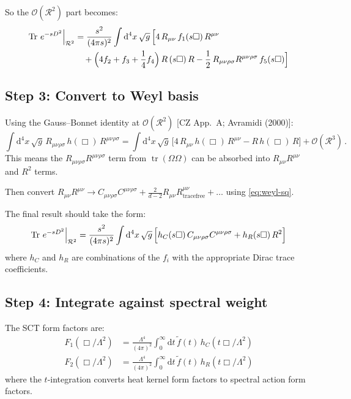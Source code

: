 \documentclass[12pt,a4paper]{article}
\theoremstyle{definition}
\theoremstyle{remark}
\newcommand{\Tr}{\operatorname{Tr}}
\newcommand{\tr}{\operatorname{tr}}
\newcommand{\Rsq}{R_{\mu\nu\rho\sigma}R^{\mu\nu\rho\sigma}}
\newcommand{\Ricsq}{R_{\mu\nu}R^{\mu\nu}}
\newcommand{\Weylsq}{C_{\mu\nu\rho\sigma}C^{\mu\nu\rho\sigma}}
\newcommand{\dd}{\mathrm{d}}
\newcommand{\fromlit}[1]{\textcolor{blue!70!black}{\textsf{[#1]}}}
\begin{document}
So the $\mathcal{O}(\mathcal{R}^2)$ part becomes:
\begin{equation}
  \begin{aligned}
  \Tr\,e^{-sD^2}\Big|_{\mathcal{R}^2}
  &= \frac{s^2}{(4\pi s)^2}\int\dd^4x\,\sqrt{g}\,\Bigl[
  4\,R_{\mu\nu}\,f_1(s\Box)\,R^{\mu\nu}\\
  &\quad+ \Bigl(4f_2 + f_3 + \frac{1}{4}f_4\Bigr)\,
    R\,(s\Box)\,R
  - \frac{1}{2}\,\Rsq\,f_5(s\Box)
  \Bigr]
  \end{aligned}
  \label{eq:heat-trace-dirac-R2}
\end{equation}


\subsection{Step 3: Convert to Weyl basis}

Using the Gauss--Bonnet identity at $\mathcal{O}(\mathcal{R}^2)$
\fromlit{CZ App.~A; Avramidi (2000)}:
\begin{equation}
  \int\dd^4x\,\sqrt{g}\, R_{\mu\nu\rho\sigma}\,h(\Box)\,R^{\mu\nu\rho\sigma}
  = \int\dd^4x\,\sqrt{g}\,\bigl[
  4\,R_{\mu\nu}\,h(\Box)\,R^{\mu\nu} - R\,h(\Box)\,R
  \bigr] + \mathcal{O}(\mathcal{R}^3)\,.
  \label{eq:GB-nonlocal}
\end{equation}
This means the $\Rsq$ term from $\tr(\Omega\Omega)$ can be absorbed
into $\Ricsq$ and $R^2$ terms.

Then convert $\Ricsq \to \Weylsq + \frac{2}{d-2}\Ricsq_{\text{tracefree}} + \ldots$
using \eqref{eq:weyl-sq}.

The final result should take the form:
\begin{equation}
  \Tr\,e^{-sD^2}\Big|_{\mathcal{R}^2}
  = \frac{s^2}{(4\pi s)^2}\int\dd^4x\,\sqrt{g}\,\Bigl[
  h_C(s\Box)\,\Weylsq + h_R(s\Box)\,R^2
  \Bigr]
  \label{eq:heat-trace-weyl}
\end{equation}
where $h_C$ and $h_R$ are combinations of the $f_i$ with the
appropriate Dirac trace coefficients.


\subsection{Step 4: Integrate against spectral weight}

The SCT form factors are:
\begin{equation}
  \boxed{
  \begin{aligned}
  F_1(\Box/\Lambda^2) &= \frac{\Lambda^4}{(4\pi)^2}
    \int_0^\infty\dd t\,\tilde{f}(t)\,
    h_C(t\Box/\Lambda^2)\\[6pt]
  F_2(\Box/\Lambda^2) &= \frac{\Lambda^4}{(4\pi)^2}
    \int_0^\infty\dd t\,\tilde{f}(t)\,
    h_R(t\Box/\Lambda^2)
  \end{aligned}
  }
  \label{eq:F1F2-integral}
\end{equation}
where the $t$-integration converts heat kernel form factors to spectral
action form factors.
\end{document}
